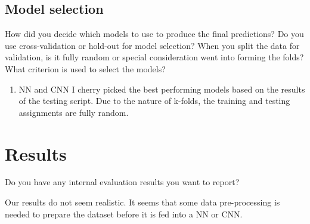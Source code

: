\documentclass[11pt,a4paper]{article}
\begin{document}
\subsection{Model selection}
How did you decide which models to use to produce the final predictions?  Do you use cross-validation or hold-out for model selection? When you split the data for validation, is it fully random or special consideration went into forming the folds? What criterion is used to select the models?

\begin{enumerate}
	\item NN and CNN
		\subitem
		I cherry picked the best performing models based on the results of the testing script.
		Due to the nature of k-folds, the training and testing assignments are fully random.

\end{enumerate}

\section{Results}
Do you have any internal evaluation results you want to report?


Our results do not seem realistic.
It seems that some data pre-processing is needed to prepare the dataset before it is fed into a NN or CNN.
\end{document}
